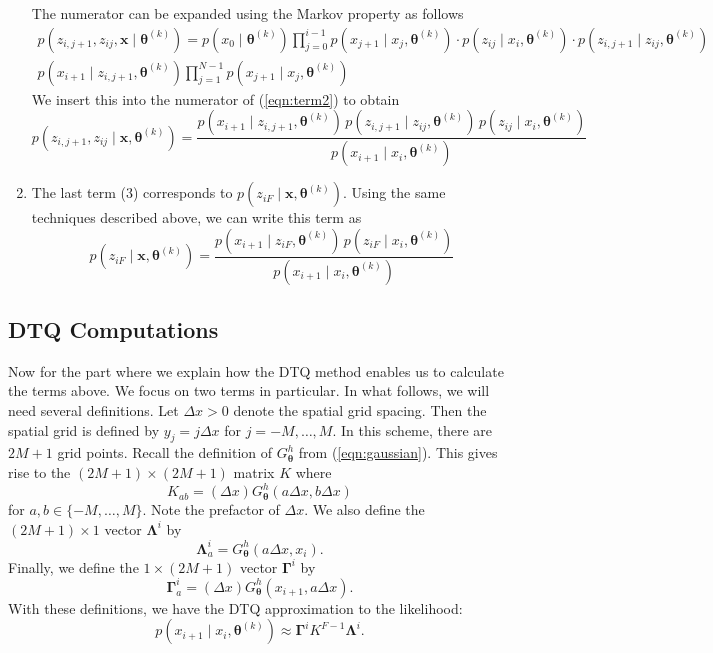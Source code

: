 \documentclass[12pt]{article}
\newcommand{\bx}{\ensuremath{\mathbf{x}}}
\newcommand{\btheta}{\ensuremath{\boldsymbol{\theta}}}
\newcommand{\bLambda}{\ensuremath{\boldsymbol{\Lambda}}}
\newcommand{\bGamma}{\ensuremath{\boldsymbol{\Gamma}}}
\begin{document}
\begin{enumerate}
\begin{equation}
\end{equation}
The numerator can be expanded using the Markov property as follows
\begin{multline*}
p(z_{i,j+1}, z_{ij}, \bx \mid \btheta^{(k)}) = p(x_0 \mid \btheta^{(k)}) \prod_{j=0}^{i-1} p(x_{j+1} \mid x_j, \btheta^{(k)}) \cdot p(z_{ij} \mid x_i, \btheta^{(k)}) \cdot p(z_{i,j+1} \mid z_{ij}, \btheta^{(k)}) \\
p(x_{i+1} \mid z_{i,j+1}, \btheta^{(k)}) \prod_{j=1}^{N-1} p(x_{j+1} \mid x_{j}, \btheta^{(k)}) 
\end{multline*}
We insert this into the numerator of (\ref{eqn:term2}) to obtain
\begin{equation}
\label{eqn:z2pt}
p(z_{i,j+1}, z_{ij} \mid \bx, \btheta^{(k)}) = \frac{ p (x_{i+1} \mid z_{i,j+1}, \btheta^{(k)}) \, p (z_{i,j+1} \mid z_{ij}, \btheta^{(k)}) \, p (z_{ij} \mid x_i, \btheta^{(k)}) }{p (x_{i+1} \mid x_{i}, \btheta^{(k)})}
\end{equation}
\item The last term (3) corresponds to $p(z_{iF} \mid \bx, \btheta^{(k)})$.  Using the same techniques described above, we can write this term as
\begin{equation}
\label{eqn:ziFterm}
p(z_{iF} \mid \bx, \btheta^{(k)}) = \frac{p(x_{i+1} \mid z_{iF}, \btheta^{(k)}) \, p(z_{iF} \mid x_{i}, \btheta^{(k)})}{p(x_{i+1} \mid x_{i}, \btheta^{(k)})}
\end{equation}
\end{enumerate}

\subsection{DTQ Computations}
Now for the part where we explain how the DTQ method enables us to calculate the terms above.  We focus on two terms in particular.  In what follows, we will need several definitions.  Let $\Delta x > 0$ denote the spatial grid spacing. Then the spatial grid is defined by $y_j = j \Delta x$ for $j = -M, \ldots, M$.  In this scheme, there are $2M+1$ grid points.  Recall the definition of $G^h_{\btheta}$ from (\ref{eqn:gaussian}).  This gives rise to the $(2M+1) \times (2M+1)$ matrix $K$ where
$$
K_{ab} = (\Delta x) G^h_{\btheta}(a \Delta x, b \Delta x)
$$
for $a, b \in \{-M, \ldots, M\}$.  Note the prefactor of $\Delta x$.  We also define the $(2M+1) \times 1$ vector $\bLambda^i$ by 
$$
\bLambda^i_a = G^h_{\btheta}(a \Delta x, x_i).
$$
Finally, we define the $1 \times (2M+1)$ vector $\bGamma^i$ by
$$
\bGamma^i_a = (\Delta x) G^h_{\btheta}( x_{i+1}, a \Delta x ).
$$
With these definitions, we have the DTQ approximation to the likelihood:
$$
p(x_{i+1} \mid x_i, \btheta^{(k)}) \approx \bGamma^i K^{F-1} \bLambda^i.
$$
\end{document}
